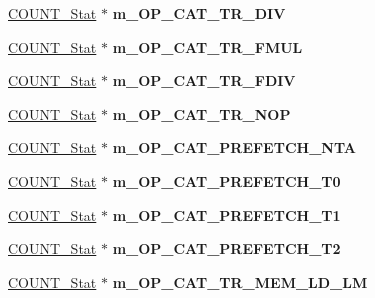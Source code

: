 \begin{DoxyCompactItemize}
\item 
\hypertarget{classall__stats__c_a715dd37e5de68601be6e8396f85458dc}{
\hyperlink{classCOUNT__Stat}{COUNT\_\-Stat} $\ast$ {\bfseries m\_\-OP\_\-CAT\_\-TR\_\-DIV}}
\label{classall__stats__c_a715dd37e5de68601be6e8396f85458dc}

\item 
\hypertarget{classall__stats__c_a6d76bfbb2ab38b48d88a8c5c7738be02}{
\hyperlink{classCOUNT__Stat}{COUNT\_\-Stat} $\ast$ {\bfseries m\_\-OP\_\-CAT\_\-TR\_\-FMUL}}
\label{classall__stats__c_a6d76bfbb2ab38b48d88a8c5c7738be02}

\item 
\hypertarget{classall__stats__c_a210e39fb3e7b24aafe0785c4c64191a4}{
\hyperlink{classCOUNT__Stat}{COUNT\_\-Stat} $\ast$ {\bfseries m\_\-OP\_\-CAT\_\-TR\_\-FDIV}}
\label{classall__stats__c_a210e39fb3e7b24aafe0785c4c64191a4}

\item 
\hypertarget{classall__stats__c_a9fab364056a914cb8d7eee599d5afbbd}{
\hyperlink{classCOUNT__Stat}{COUNT\_\-Stat} $\ast$ {\bfseries m\_\-OP\_\-CAT\_\-TR\_\-NOP}}
\label{classall__stats__c_a9fab364056a914cb8d7eee599d5afbbd}

\item 
\hypertarget{classall__stats__c_ae334116b8312edaccd5aa46b0a120a4f}{
\hyperlink{classCOUNT__Stat}{COUNT\_\-Stat} $\ast$ {\bfseries m\_\-OP\_\-CAT\_\-PREFETCH\_\-NTA}}
\label{classall__stats__c_ae334116b8312edaccd5aa46b0a120a4f}

\item 
\hypertarget{classall__stats__c_aa14030adf444c1ad17e3794e7448f02b}{
\hyperlink{classCOUNT__Stat}{COUNT\_\-Stat} $\ast$ {\bfseries m\_\-OP\_\-CAT\_\-PREFETCH\_\-T0}}
\label{classall__stats__c_aa14030adf444c1ad17e3794e7448f02b}

\item 
\hypertarget{classall__stats__c_a7fd5e7f96c5310e1590e252bf967b6dd}{
\hyperlink{classCOUNT__Stat}{COUNT\_\-Stat} $\ast$ {\bfseries m\_\-OP\_\-CAT\_\-PREFETCH\_\-T1}}
\label{classall__stats__c_a7fd5e7f96c5310e1590e252bf967b6dd}

\item 
\hypertarget{classall__stats__c_a8692a9f40aaaaf1b4134867f97f1eadb}{
\hyperlink{classCOUNT__Stat}{COUNT\_\-Stat} $\ast$ {\bfseries m\_\-OP\_\-CAT\_\-PREFETCH\_\-T2}}
\label{classall__stats__c_a8692a9f40aaaaf1b4134867f97f1eadb}

\item 
\hypertarget{classall__stats__c_a970b0cea95dba0bc8b7e9c29417b69ba}{
\hyperlink{classCOUNT__Stat}{COUNT\_\-Stat} $\ast$ {\bfseries m\_\-OP\_\-CAT\_\-TR\_\-MEM\_\-LD\_\-LM}}
\label{classall__stats__c_a970b0cea95dba0bc8b7e9c29417b69ba}


\end{DoxyCompactItemize}
